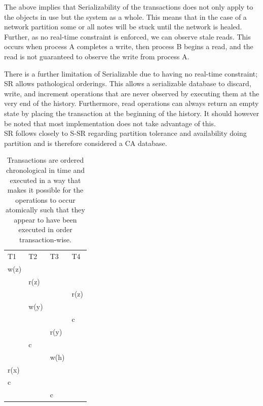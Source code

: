 \documentclass[a4paper,10pt,titlepage]{report}
\begin{document}
    The above implies that Serializability of the transactions does not only apply to the objects in use but the system as a whole. This means that in the case of a network partition some or all notes will be stuck until the network is healed. Further, as no real-time constraint is enforced,  we can observe stale reads. This occurs when process A completes a write, then process B begins a read, and the read is not guaranteed to observe the write from process A.
    \\ \vspace{5mm}

    There is a further limitation of Serializable due to having no real-time constraint; SR allows pathological orderings. This allows a serializable database to discard, write, and increment operations that are never observed by executing them at the very end of the history. Furthermore, read operations can always return an empty state by placing the transaction at the beginning of the history. It should however be noted that most implementation does not take advantage of this.
\\ \vspace{5mm}
    SR follows closely to S-SR regarding partition tolerance and availability doing partition and is therefore considered a CA database.
\\ \vspace{5mm}
    \begin{table}[h]
        \begin{tabular}{l|l|l|l}
            T1   & T2   & T3   & T4   \\
            w(z) &      &      &      \\
            & r(z) &      &      \\
            &      &      & r(z) \\
            & w(y) &      &      \\
            &      &      & c    \\
            &      & r(y) &      \\
            & c    &      &      \\
            &      & w(h) &      \\
            r(x) &      &      &      \\
            c    &      &      &      \\
            &      & c    &
        \end{tabular}
        \caption{Transactions are ordered chronological in time and executed in a way that makes it possible for the operations to occur atomically such that they appear to have been executed in order transaction-wise. }
    \end{table}
    \newpage
\end{document}
